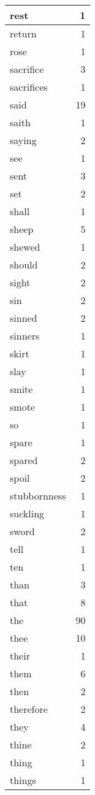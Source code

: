 \begin{center}
\begin{longtable}{l|r}
rest & 1 \\ \hline
return & 1 \\ \hline
rose & 1 \\ \hline
sacrifice & 3 \\ \hline
sacrifices & 1 \\ \hline
said & 19 \\ \hline
saith & 1 \\ \hline
saying & 2 \\ \hline
see & 1 \\ \hline
sent & 3 \\ \hline
set & 2 \\ \hline
shall & 1 \\ \hline
sheep & 5 \\ \hline
shewed & 1 \\ \hline
should & 2 \\ \hline
sight & 2 \\ \hline
sin & 2 \\ \hline
sinned & 2 \\ \hline
sinners & 1 \\ \hline
skirt & 1 \\ \hline
slay & 1 \\ \hline
smite & 1 \\ \hline
smote & 1 \\ \hline
so & 1 \\ \hline
spare & 1 \\ \hline
spared & 2 \\ \hline
spoil & 2 \\ \hline
stubbornness & 1 \\ \hline
suckling & 1 \\ \hline
sword & 2 \\ \hline
tell & 1 \\ \hline
ten & 1 \\ \hline
than & 3 \\ \hline
that & 8 \\ \hline
the & 90 \\ \hline
thee & 10 \\ \hline
their & 1 \\ \hline
them & 6 \\ \hline
then & 2 \\ \hline
therefore & 2 \\ \hline
they & 4 \\ \hline
thine & 2 \\ \hline
thing & 1 \\ \hline
things & 1 \\ \hline

\end{longtable}
\end{center}
